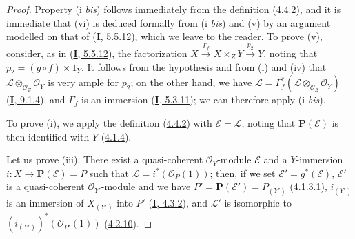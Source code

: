 \begin{proof}
Property (i \emph{bis}) follows immediately from the definition
(\hyperref[II.4.4.2]{4.4.2}), and it is immediate that (vi) is deduced
formally from (i \emph{bis}) and (v) by an argument modelled on that of
(\hyperref[I.5.5.12]{\textbf{I}, 5.5.12}), which we leave to the reader. To
prove (v), consider, as in
(\hyperref[I.5.5.12]{\textbf{I}, 5.5.12}), the factorization
$X\xrightarrow{\Gamma_f}X\times_ZY\xrightarrow{p_2}Y$, noting that
$p_2=(g\circ f)\times1_Y$. It follows from the hypothesis and from (i) and (iv)
that $\mathcal{L}\otimes_{\mathcal{O}_Z}\mathcal{O}_Y$ is very ample for
$p_2$; on the other hand, we have
$\mathcal{L}=\Gamma_f^*(\mathcal{L}\otimes_{\mathcal{O}_Z}\mathcal{O}_Y)$
(\hyperref[I.9.1.4]{\textbf{I}, 9.1.4}), and $\Gamma_f$ is an immersion
(\hyperref[I.5.3.11]{\textbf{I}, 5.3.11}); we can therefore apply (i \emph{bis}).


To prove (i), we apply the definition
(\hyperref[II.4.4.2]{4.4.2}) with $\mathcal{E}=\mathcal{L}$, noting
that $\mathbf{P}(\mathcal{E})$ is then identified with $Y$
(\hyperref[II.4.1.4]{4.1.4}).

Let us prove (iii). There exist a quasi-coherent $\mathcal{O}_Y$-module
$\mathcal{E}$ and a $Y$-immersion $i:X\to\mathbf{P}(\mathcal{E})=P$ such
that $\mathcal{L}=i^*(\mathcal{O}_P(1))$; then, if we set
$\mathcal{E}'=g^*(\mathcal{E})$, $\mathcal{E}'$ is a quasi-coherent
$\mathcal{O}_{Y'}$-module and we have
$P'=\mathbf{P}(\mathcal{E}')=P_{(Y')}$
(\hyperref[II.4.1.3.1]{4.1.3.1}), $i_{(Y')}$ is an immersion of
$X_{(Y')}$ into $P'$ (\hyperref[I.4.3.2]{\textbf{I}, 4.3.2}), and $\mathcal{L}'$ is
isomorphic to $(i_{(Y')})^*(\mathcal{O}_{P'}(1))$
(\hyperref[II.4.2.10]{4.2.10}).


\end{proof}
